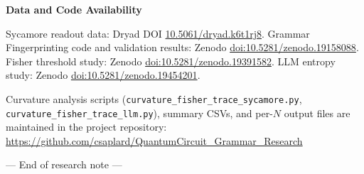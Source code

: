 \documentclass[11pt,a4paper]{article}
\begin{document}
\vspace{0.6em}
\noindent\textbf{Data and Code Availability}

Sycamore readout data: Dryad DOI \href{https://doi.org/10.5061/dryad.k6t1rj8}{10.5061/dryad.k6t1rj8}. Grammar Fingerprinting code and validation results: Zenodo \href{https://doi.org/10.5281/zenodo.19158088}{doi:10.5281/zenodo.19158088}. Fisher threshold study: Zenodo \href{https://doi.org/10.5281/zenodo.19391582}{doi:10.5281/zenodo.19391582}. LLM entropy study: Zenodo \href{https://doi.org/10.5281/zenodo.19454201}{doi:10.5281/zenodo.19454201}.

\begin{sloppypar}
Curvature analysis scripts (\texttt{curvature\_fisher\_trace\_sycamore.py}, \texttt{curvature\_fisher\_trace\_llm.py}), summary CSVs, and per-$N$ output files are maintained in the project repository:\\
\url{https://github.com/csaplard/QuantumCircuit_Grammar_Research}
\end{sloppypar}

\vspace{0.8em}
\begin{center}
--- End of research note ---
\end{center}
\end{document}
